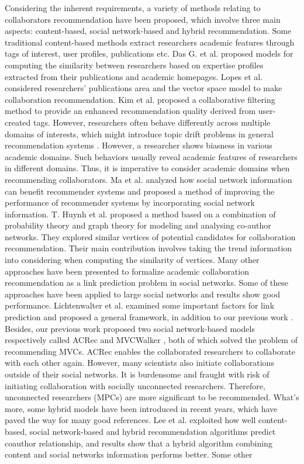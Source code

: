 \documentclass[10pt]{article}
\begin{document}
Considering the inherent requirements, a variety of methods relating to collaborators recommendation have been proposed, which involve three main aspects: content-based, social network-based and hybrid recommendation. Some traditional content-based methods extract researchers academic features through tags of interest, user profiles, publications etc. Das G. et al. \cite{gollapalli2012similar} proposed models for computing the similarity between researchers based on expertise profiles extracted from their publications and academic homepages. Lopes et al. \cite{lopes2010collaboration} considered researchers' publications area and the vector space model to make collaboration recommendation. Kim et al. \cite{kim2010collaborative} proposed a collaborative filtering method to provide an enhanced recommendation quality derived from user-created tags. However, researchers often behave differently across multiple domains of interests, which might introduce topic drift problems in general recommendation systems \cite{tang2012cross}. However, a researcher shows biasness in various academic domains. Such behaviors usually reveal academic features of researchers in different domains. Thus, it is imperative to consider academic domains when recommending collaborators. Ma et al. \cite{ma2011recommender} analyzed how social network information can benefit recommender systems and proposed a method of improving the performance of recommender systems by incorporating social network information. T. Huynh et al. \cite{huynh2013trend} proposed a method based on a combination of probability theory and graph theory for modeling and analysing co-author networks. They explored similar vertices of potential candidates for collaboration recommendation. Their main contribution involves taking the trend information into considering when computing the similarity of vertices. Many other approaches \cite{chen2012discovering,sun2011co} have been presented to formalize academic collaboration recommendation as a link prediction problem in social networks. Some of these approaches have been applied to large social networks and results show good performance. Lichtenwalter et al. \cite{lichtenwalter2010new} examined some important factors for link prediction and proposed a general framework, in addition to our previous work \cite{li2014acrec,xia2014mvcwalker}. Besides, our previous work proposed two social network-based models respectively called ACRec \cite{li2014acrec} and MVCWalker \cite{xia2014mvcwalker}, both of which solved the problem of recommending MVCs. ACRec enables the collaborated researchers to collaborate with each other again. However, many scientists also initiate collaborations outside of their social networks. It is burdensome and fraught with risk of initiating collaboration with socially unconnected researchers. Therefore, unconnected researchers (MPCs) are more significant to be recommended. What's more, some hybrid models have been introduced in recent years, which have paved the way for many good references. Lee et al. \cite{lee2011recommending} exploited how well content-based, social network-based and hybrid recommendation algorithms predict coauthor relationship, and results show that a hybrid algorithm combining content and social networks information performs better. Some other 
\end{document}
